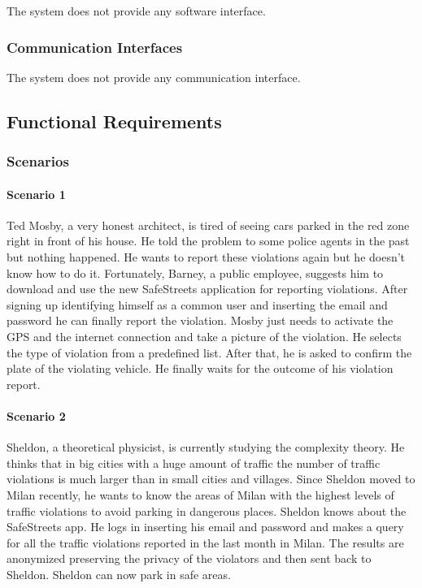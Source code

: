 \documentclass[a4paper]{article}
\begin{document}
The system does not provide any software interface.

\subsubsection{Communication Interfaces}

The system does not provide any communication interface.

\subsection{Functional Requirements}

\subsubsection{Scenarios}

\paragraph{Scenario 1}
Ted Mosby, a very honest architect, is tired of seeing cars parked in
the red zone right in front of his house. He told the problem to some
police agents in the past but nothing happened. He wants to report these
violations again but he doesn't know how to do it. Fortunately, Barney,
a public employee, suggests him to download and use the new SafeStreets
application for reporting violations. After signing up identifying
himself as a common user and inserting the email and password he can
finally report the violation. Mosby just needs to activate the GPS and
the internet connection and take a picture of the violation. He selects
the type of violation from a predefined list. After that, he is asked to
confirm the plate of the violating vehicle. He finally waits for the
outcome of his violation report.

\paragraph{Scenario 2}
Sheldon, a theoretical physicist, is currently studying the complexity
theory. He thinks that in big cities with a huge amount of traffic the
number of traffic violations is much larger than in small cities and
villages. Since Sheldon moved to Milan recently, he wants to know the
areas of Milan with the highest levels of traffic violations to avoid
parking in dangerous places. Sheldon knows about the SafeStreets app. He
logs in inserting his email and password and makes a query for all the
traffic violations reported in the last month in Milan. The results are
anonymized preserving the privacy of the violators and then sent back to
Sheldon. Sheldon can now park in safe areas.
\end{document}
